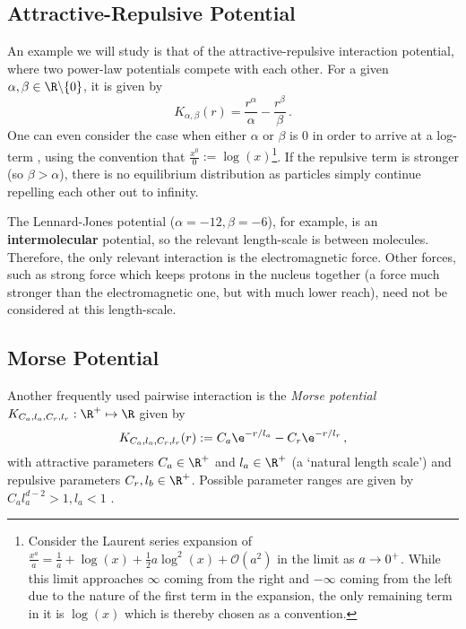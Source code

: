 \subsection{Attractive-Repulsive Potential}
An example we will study is that of the attractive-repulsive interaction potential, where two power-law potentials compete with each other.
For a given $\alpha, \beta \in \R \backslash \{0\}$, it is given by
\begin{equation}
  K_{\alpha, \beta}(r) = \frac{r^\alpha}{\alpha} - \frac{r^\beta}{\beta}\,.
  \label{eq:attractive-repulsive-potential}
\end{equation}
One can even consider the case when either $\alpha$ or $\beta$ is 0 in order to arrive at a log-term \parencite{2017-explicit-solutions}, using the convention that $\frac{x^0}{0} := \log(x)$\footnote{
  Consider the Laurent series expansion of $\frac{x^a}{a} = \frac{1}{a} + \log(x) + \frac{1}{2}a \log^2(x) + \mathcal{O}(a^2)$ in the limit as $a \rightarrow 0^+$.
  While this limit approaches $\infty$ coming from the right and $-\infty$ coming from the left due to the nature of the first term in the expansion, the only remaining term in it is $\log(x)$ which is thereby chosen as a convention.
}.
If the repulsive term is stronger (so $\beta > \alpha$), there is no equilibrium distribution as particles simply continue repelling each other out to infinity.

The Lennard-Jones potential ($\alpha=-12, \beta=-6$), for example, is an \textbf{intermolecular} potential, so the relevant length-scale is between molecules.
Therefore, the only relevant interaction is the electromagnetic force.
Other forces, such as strong force which keeps protons in the nucleus together (a force much stronger than the electromagnetic one, but with much lower reach), need not be considered at this length-scale.

\subsection{Morse Potential}
Another frequently used pairwise interaction is the \textit{Morse potential} $K_{C_a, l_a, C_r, l_r}: \R^+ \mapsto \R$ given by
\begin{equation}
  K_{C_a, l_a, C_r, l_r}(r) := C_a \e^{-r / l_a} - C_r \e^{-r / l_r}\,,
  \label{eq:morse-potential}
\end{equation}
with attractive parameters $C_a \in \R^+$ and $l_a \in \R^+$ (a `natural length scale') and repulsive parameters $C_r, l_b \in \R^+$.
Possible parameter ranges are given by $C_a l_a^{d-2} > 1, l_a < 1$ \parencite{2006-self-propelled,2014-explicit-flock-solutions-for-quasi-morse-potentials}.
\hierKoennteIhreWerbungStehen

